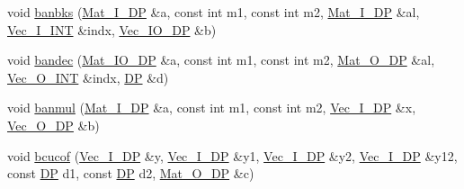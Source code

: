 \begin{DoxyCompactItemize}
void \mbox{\hyperlink{namespaceNR_af240c4551b9a0a9c5cde123be9205132}{banbks}} (\mbox{\hyperlink{namespaceNR_a2b8abfda8fffad6ba0a1b5a4c0773dbf}{Mat\+\_\+\+I\+\_\+\+DP}} \&a, const int m1, const int m2, \mbox{\hyperlink{namespaceNR_a2b8abfda8fffad6ba0a1b5a4c0773dbf}{Mat\+\_\+\+I\+\_\+\+DP}} \&al, \mbox{\hyperlink{namespaceNR_ae67ce7dc86a8a64a7ce73c3c030ff610}{Vec\+\_\+\+I\+\_\+\+I\+NT}} \&indx, \mbox{\hyperlink{namespaceNR_ab293e06a6bf799d8a7ed932b6852bcb8}{Vec\+\_\+\+I\+O\+\_\+\+DP}} \&b)
\item 
void \mbox{\hyperlink{namespaceNR_ad98237b2408813153be739eb27223c44}{bandec}} (\mbox{\hyperlink{namespaceNR_ad1513aa4697878ed3bff0b8b3c9dd910}{Mat\+\_\+\+I\+O\+\_\+\+DP}} \&a, const int m1, const int m2, \mbox{\hyperlink{namespaceNR_adc1f8da33094b6bbeb1f5f899515ce54}{Mat\+\_\+\+O\+\_\+\+DP}} \&al, \mbox{\hyperlink{namespaceNR_ade2338f6d53b7da3dd6d1c04804541f2}{Vec\+\_\+\+O\+\_\+\+I\+NT}} \&indx, \mbox{\hyperlink{namespaceNR_af6ff762dd605ff477b8e52387253a02a}{DP}} \&d)
\item 
void \mbox{\hyperlink{namespaceNR_a6c1a4ae0a3f56dd2d6c3a24d04681fa0}{banmul}} (\mbox{\hyperlink{namespaceNR_a2b8abfda8fffad6ba0a1b5a4c0773dbf}{Mat\+\_\+\+I\+\_\+\+DP}} \&a, const int m1, const int m2, \mbox{\hyperlink{namespaceNR_a9f943da53862537c552e2a770cb170ae}{Vec\+\_\+\+I\+\_\+\+DP}} \&x, \mbox{\hyperlink{namespaceNR_a970094d23441f8ef6a45282a7eb2103d}{Vec\+\_\+\+O\+\_\+\+DP}} \&b)
\item 
void \mbox{\hyperlink{namespaceNR_a82353f6fd70a72d599d3b4603afd3f43}{bcucof}} (\mbox{\hyperlink{namespaceNR_a9f943da53862537c552e2a770cb170ae}{Vec\+\_\+\+I\+\_\+\+DP}} \&y, \mbox{\hyperlink{namespaceNR_a9f943da53862537c552e2a770cb170ae}{Vec\+\_\+\+I\+\_\+\+DP}} \&y1, \mbox{\hyperlink{namespaceNR_a9f943da53862537c552e2a770cb170ae}{Vec\+\_\+\+I\+\_\+\+DP}} \&y2, \mbox{\hyperlink{namespaceNR_a9f943da53862537c552e2a770cb170ae}{Vec\+\_\+\+I\+\_\+\+DP}} \&y12, const \mbox{\hyperlink{namespaceNR_af6ff762dd605ff477b8e52387253a02a}{DP}} d1, const \mbox{\hyperlink{namespaceNR_af6ff762dd605ff477b8e52387253a02a}{DP}} d2, \mbox{\hyperlink{namespaceNR_adc1f8da33094b6bbeb1f5f899515ce54}{Mat\+\_\+\+O\+\_\+\+DP}} \&c)
\item 

\end{DoxyCompactItemize}
